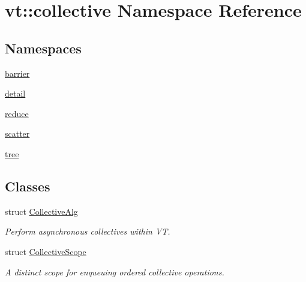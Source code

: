 \hypertarget{namespacevt_1_1collective}{}\section{vt\+:\+:collective Namespace Reference}
\label{namespacevt_1_1collective}
\subsection*{Namespaces}
\begin{DoxyCompactItemize}
\item 
 \hyperlink{namespacevt_1_1collective_1_1barrier}{barrier}
\item 
 \hyperlink{namespacevt_1_1collective_1_1detail}{detail}
\item 
 \hyperlink{namespacevt_1_1collective_1_1reduce}{reduce}
\item 
 \hyperlink{namespacevt_1_1collective_1_1scatter}{scatter}
\item 
 \hyperlink{namespacevt_1_1collective_1_1tree}{tree}
\end{DoxyCompactItemize}
\subsection*{Classes}
\begin{DoxyCompactItemize}
\item 
struct \hyperlink{structvt_1_1collective_1_1_collective_alg}{Collective\+Alg}
\begin{DoxyCompactList}\small\item\em Perform asynchronous collectives within VT. \end{DoxyCompactList}\item 
struct \hyperlink{structvt_1_1collective_1_1_collective_scope}{Collective\+Scope}
\begin{DoxyCompactList}\small\item\em A distinct scope for enqueuing ordered collective operations. \end{DoxyCompactList}\end{DoxyCompactItemize}
